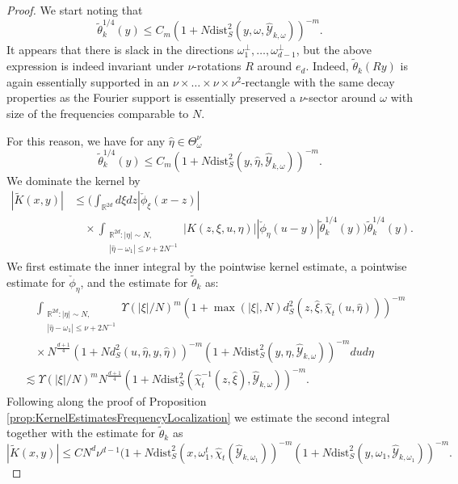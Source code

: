 \documentclass{amsart}
\numberwithin{equation}{section}
\theoremstyle{definition}
\newcommand{\R}{\mathbb{R}}
\begin{document}
\begin{proof}
We start noting that
\begin{equation*}
\tilde{\theta}_k^{1/4} (y) \leq C_m (1+ N \text{dist}_S^2(y,\omega,\hat{\mathcal{Y}}_{k,\omega}))^{-m}.
\end{equation*}
It appears that there is slack in the directions $\omega_1^{\perp},\ldots,\omega_{d-1}^{\perp}$, but the above expression is indeed invariant under $\nu$-rotations $R$ around $e_d$. Indeed, $\tilde{\theta}_k(R y)$ is again essentially supported in an $\nu \times \ldots \times \nu \times \nu^2$-rectangle with the same decay properties as the Fourier support is essentially preserved a $\nu$-sector around $\omega$ with size of the frequencies comparable to $N$. 

For this reason, we have for any $\hat{\eta} \in \Theta^{\nu}_{\omega}$
\begin{equation*}
\tilde{\theta}_k^{1/4}(y) \leq C_m (1+ N \text{dist}_S^2(y,\hat{\eta},\hat{\mathcal{Y}}_{k,\omega}))^{-m}.
\end{equation*}
We dominate the kernel by
\begin{equation*}
\begin{split}
    |\tilde{K}(x,y)| &\leq \Big( \int_{\R^{2d}} d\xi dz |\check{\phi}_{\xi}(x-z)| \\
    &\quad \times \int_{\substack{\R^{2d}: |\eta| \sim N, \\ |\hat{\eta} - \omega_1| \leq \nu + 2 N^{-1}}} |K(z,\xi,u,\eta)| |\check{\phi}_{\eta}(u-y)| \tilde{\theta}_k^{1/4}(y) \Big) \tilde{\theta}_k^{1/4}(y).
\end{split}
\end{equation*}
We first estimate the inner integral by the pointwise kernel estimate, a pointwise estimate for $\check{\phi}_{\eta}$, and the estimate for $\tilde{\theta}_k$ as:
\begin{equation*}
\begin{split}
    &\quad \int_{\substack{\R^{2d}: |\eta| \sim N, \\ |\hat{\eta} - \omega_1| \leq \nu + 2 N^{-1}}} \Upsilon(|\xi|/N)^m (1+ \max(|\xi|,N) d_S^2(z,\hat{\xi},\hat{\chi}_t(u,\hat{\eta})))^{-m} \\
    &\quad \times N^{\frac{d+1}{4}} (1+ N d_S^2(u,\hat{\eta},y,\hat{\eta}))^{-m} (1+ N \text{dist}_S^2(y,\hat{\eta},\hat{\mathcal{Y}}_{k,\omega}))^{-m} du d\eta \\
    &\lesssim \Upsilon(|\xi|/N)^m N^{\frac{d+1}{4}} (1+ N \text{dist}_S^2(\hat{\chi}_t^{-1}(z,\hat{\xi}),\hat{\mathcal{Y}}_{k,\omega}))^{-m}.
    \end{split}
\end{equation*}
Following along the proof of Proposition \ref{prop:KernelEstimatesFrequencyLocalization} we estimate the second integral together with the estimate for $\tilde{\theta}_k$ as
\begin{equation*}
    |\tilde{K}(x,y)| \leq C N^{d} \nu^{d-1} (1+ N \text{dist}_S^2(x,\omega_1^t,\hat{\chi}_t(\hat{\mathcal{Y}}_{k,\omega_1}))^{-m} (1+ N \text{dist}_S^2(y,\omega_1, \hat{\mathcal{Y}}_{k,\omega_1}))^{-m}.
\end{equation*}
\end{proof}
\end{document}
